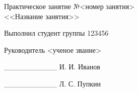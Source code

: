 \thispagestyle{empty}
\setlength{\parindent}{0ex} %

\begin{center}
  Практическое занятие №<номер занятия> \\
  <<Название занятия>>
\end{center}

\vspace{1\baselineskip}

\begin{minipage}{.55\linewidth}
    Выполнил студент группы 123456 

    \smallskip

    Руководитель <ученое звание>
\end{minipage}
\hfill
\begin{minipage}{.4\linewidth}
  \begin{flushright}
    \_\_\_\_\_\_\_\_\_\_ И. И. Иванов

    \smallskip

    \_\_\_\_\_\_\_\_\_\_ Л. С. Пупкин
  \end{flushright}
\end{minipage}

\setlength{\parindent}{5ex} %
